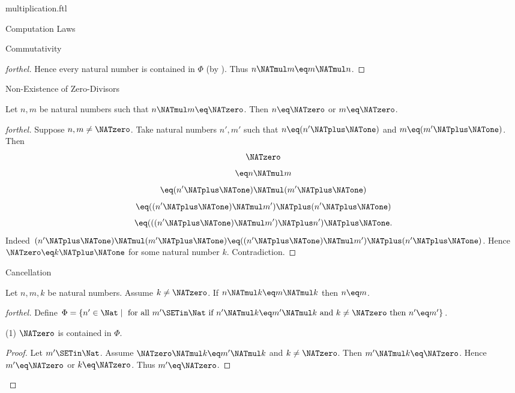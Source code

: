\documentclass{stex}
\begin{document}
\begin{smodule}{multiplication.ftl}
\begin{sfragment}{Computation Laws}
\begin{sfragment}{Commutativity}
\begin{proof}[forthel]
      Hence every natural number is contained in $\Phi$ (by ).
      Thus $n \NATmul m \eq m \NATmul n$.
    \end{proof}
  \end{sfragment}

  \begin{sfragment}{Non-Existence of Zero-Divisors}
    \begin{proposition}[forthel,id=ARITHMETIC_06_3843962875936768]
      Let $n, m$ be natural numbers such that $n \NATmul m \eq \NATzero$.
      Then $n \eq \NATzero$ or $m \eq \NATzero$.
    \end{proposition}
    \begin{proof}[forthel]
      Suppose $n, m \neq \NATzero$.
      Take natural numbers $n', m'$ such that $n \eq (n' \NATplus \NATone)$ and $m \eq (m' \NATplus \NATone)$.
      Then
      \[  \NATzero                                     \]
      \[    \eq n \NATmul m                         \]
      \[    \eq (n' \NATplus \NATone) \NATmul (m' \NATplus \NATone)           \]
      \[    \eq ((n' \NATplus \NATone) \NATmul m') \NATplus (n' \NATplus \NATone)    \]
      \[    \eq (((n' \NATplus \NATone) \NATmul m') \NATplus n') \NATplus \NATone.   \]
      Indeed $(n' \NATplus \NATone) \NATmul (m' \NATplus \NATone) \eq ((n' \NATplus \NATone) \NATmul m') \NATplus (n' \NATplus \NATone)$.
      Hence $\NATzero \eq k \NATplus \NATone$ for some natural number $k$.
      Contradiction.
    \end{proof}
  \end{sfragment}

  \begin{sfragment}{Cancellation}
    \begin{proposition}[forthel,id=ARITHMETIC_06_31055184658432]
      Let $n, m, k$ be natural numbers.
      Assume $k \neq \NATzero$.
      If $n \NATmul k \eq m \NATmul k$ then $n \eq m$.
    \end{proposition}
    \begin{proof}[forthel]
      Define $\Phi = \{ n' \in \Nat \mid\text{ for all }m' \SETin \Nat\text{ if }n' \NATmul k \eq m' \NATmul k\text{ and }k \neq \NATzero\text{ then }n' \eq m' \}$.

      (1) $\NATzero$ is contained in $\Phi$.
      \begin{proof}
        Let $m' \SETin \Nat$.
        Assume $\NATzero \NATmul k \eq m' \NATmul k$ and $k \neq \NATzero$.
        Then $m' \NATmul k \eq \NATzero$.
        Hence $m' \eq \NATzero$ or $k \eq \NATzero$.
        Thus $m' \eq \NATzero$.
      \end{proof}


\end{proof}
\end{sfragment}
\end{sfragment}
\end{smodule}
\end{document}
